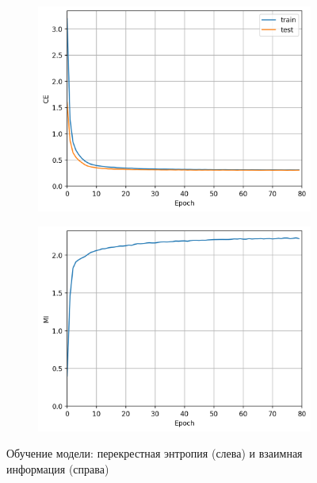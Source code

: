 \documentclass[a4paper,12pt]{article}
\begin{document}
	\begin{figure}[h!]
		\centering
		\begin{subfigure}{0.35\linewidth}
			\includegraphics[width=\linewidth]{figures/ce}
		\end{subfigure}
		\begin{subfigure}{0.35\linewidth}
			\includegraphics[width=\linewidth]{figures/mi}
		\end{subfigure}
		\caption{Обучение модели: перекрестная энтропия (слева) и взаимная информация (справа)}
	\end{figure}
	
\end{document}
